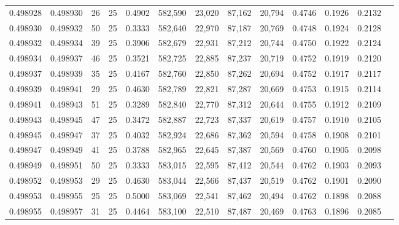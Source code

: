 \begin{tabular}{rrrrrrrrrrrrr}
0.498928 & 0.498930 &    26 &  25 &                                     0.4902 & 582,590 &  23,020 &  87,162 &  20,794 & 0.4746 & 0.1926 & 0.2132 \\
0.498930 & 0.498932 &    50 &  25 &                                     0.3333 & 582,640 &  22,970 &  87,187 &  20,769 & 0.4748 & 0.1924 & 0.2128 \\
0.498932 & 0.498934 &    39 &  25 &                                     0.3906 & 582,679 &  22,931 &  87,212 &  20,744 & 0.4750 & 0.1922 & 0.2124 \\
0.498934 & 0.498937 &    46 &  25 &                                     0.3521 & 582,725 &  22,885 &  87,237 &  20,719 & 0.4752 & 0.1919 & 0.2120 \\
0.498937 & 0.498939 &    35 &  25 &                                     0.4167 & 582,760 &  22,850 &  87,262 &  20,694 & 0.4752 & 0.1917 & 0.2117 \\
0.498939 & 0.498941 &    29 &  25 &                                     0.4630 & 582,789 &  22,821 &  87,287 &  20,669 & 0.4753 & 0.1915 & 0.2114 \\
0.498941 & 0.498943 &    51 &  25 &                                     0.3289 & 582,840 &  22,770 &  87,312 &  20,644 & 0.4755 & 0.1912 & 0.2109 \\
0.498943 & 0.498945 &    47 &  25 &                                     0.3472 & 582,887 &  22,723 &  87,337 &  20,619 & 0.4757 & 0.1910 & 0.2105 \\
0.498945 & 0.498947 &    37 &  25 &                                     0.4032 & 582,924 &  22,686 &  87,362 &  20,594 & 0.4758 & 0.1908 & 0.2101 \\
0.498947 & 0.498949 &    41 &  25 &                                     0.3788 & 582,965 &  22,645 &  87,387 &  20,569 & 0.4760 & 0.1905 & 0.2098 \\
0.498949 & 0.498951 &    50 &  25 &                                     0.3333 & 583,015 &  22,595 &  87,412 &  20,544 & 0.4762 & 0.1903 & 0.2093 \\
0.498952 & 0.498953 &    29 &  25 &                                     0.4630 & 583,044 &  22,566 &  87,437 &  20,519 & 0.4762 & 0.1901 & 0.2090 \\
0.498953 & 0.498955 &    25 &  25 &                                     0.5000 & 583,069 &  22,541 &  87,462 &  20,494 & 0.4762 & 0.1898 & 0.2088 \\
0.498955 & 0.498957 &    31 &  25 &                                     0.4464 & 583,100 &  22,510 &  87,487 &  20,469 & 0.4763 & 0.1896 & 0.2085 \\

\end{tabular}
